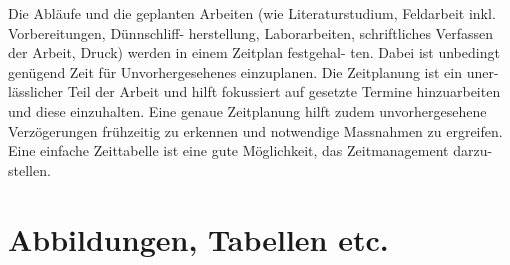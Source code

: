 \documentclass[12pt,a4paper, usenames, dvipsnames]{scrartcl}
\begin{document}
\begin{footnotesize}
Die Abläufe und die geplanten Arbeiten (wie Literaturstudium, Feldarbeit inkl. Vorbereitungen, Dünnschliff-
herstellung, Laborarbeiten, schriftliches Verfassen der Arbeit, Druck) werden in einem Zeitplan festgehal-
ten. Dabei ist unbedingt genügend Zeit für Unvorhergesehenes einzuplanen. Die Zeitplanung ist ein uner-
lässlicher Teil der Arbeit und hilft fokussiert auf gesetzte Termine hinzuarbeiten und diese einzuhalten. Eine
genaue Zeitplanung hilft zudem unvorhergesehene Verzögerungen frühzeitig zu erkennen und notwendige
Massnahmen zu ergreifen. Eine einfache Zeittabelle ist eine gute Möglichkeit, das Zeitmanagement darzu-
stellen.
\end{footnotesize}


\newpage

\section{Abbildungen, Tabellen etc.}
\end{document}
